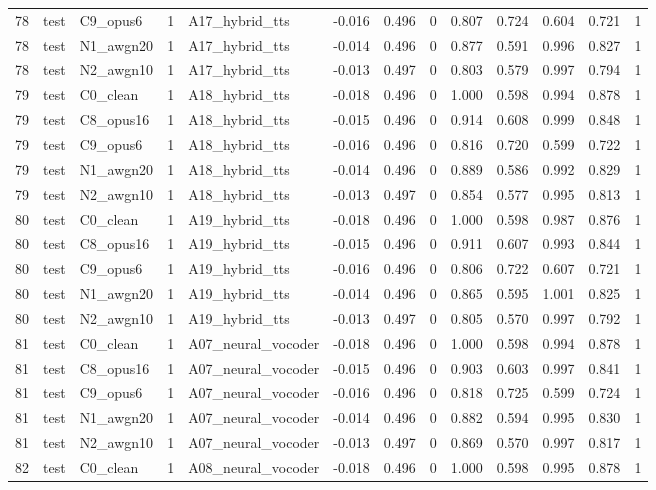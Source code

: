 \begin{tabular}{rllrlrrrrrrrr}
78 & test & C9_opus6 & 1 & A17_hybrid_tts & -0.016 & 0.496 & 0 & 0.807 & 0.724 & 0.604 & 0.721 & 1 \\
78 & test & N1_awgn20 & 1 & A17_hybrid_tts & -0.014 & 0.496 & 0 & 0.877 & 0.591 & 0.996 & 0.827 & 1 \\
78 & test & N2_awgn10 & 1 & A17_hybrid_tts & -0.013 & 0.497 & 0 & 0.803 & 0.579 & 0.997 & 0.794 & 1 \\
79 & test & C0_clean & 1 & A18_hybrid_tts & -0.018 & 0.496 & 0 & 1.000 & 0.598 & 0.994 & 0.878 & 1 \\
79 & test & C8_opus16 & 1 & A18_hybrid_tts & -0.015 & 0.496 & 0 & 0.914 & 0.608 & 0.999 & 0.848 & 1 \\
79 & test & C9_opus6 & 1 & A18_hybrid_tts & -0.016 & 0.496 & 0 & 0.816 & 0.720 & 0.599 & 0.722 & 1 \\
79 & test & N1_awgn20 & 1 & A18_hybrid_tts & -0.014 & 0.496 & 0 & 0.889 & 0.586 & 0.992 & 0.829 & 1 \\
79 & test & N2_awgn10 & 1 & A18_hybrid_tts & -0.013 & 0.497 & 0 & 0.854 & 0.577 & 0.995 & 0.813 & 1 \\
80 & test & C0_clean & 1 & A19_hybrid_tts & -0.018 & 0.496 & 0 & 1.000 & 0.598 & 0.987 & 0.876 & 1 \\
80 & test & C8_opus16 & 1 & A19_hybrid_tts & -0.015 & 0.496 & 0 & 0.911 & 0.607 & 0.993 & 0.844 & 1 \\
80 & test & C9_opus6 & 1 & A19_hybrid_tts & -0.016 & 0.496 & 0 & 0.806 & 0.722 & 0.607 & 0.721 & 1 \\
80 & test & N1_awgn20 & 1 & A19_hybrid_tts & -0.014 & 0.496 & 0 & 0.865 & 0.595 & 1.001 & 0.825 & 1 \\
80 & test & N2_awgn10 & 1 & A19_hybrid_tts & -0.013 & 0.497 & 0 & 0.805 & 0.570 & 0.997 & 0.792 & 1 \\
81 & test & C0_clean & 1 & A07_neural_vocoder & -0.018 & 0.496 & 0 & 1.000 & 0.598 & 0.994 & 0.878 & 1 \\
81 & test & C8_opus16 & 1 & A07_neural_vocoder & -0.015 & 0.496 & 0 & 0.903 & 0.603 & 0.997 & 0.841 & 1 \\
81 & test & C9_opus6 & 1 & A07_neural_vocoder & -0.016 & 0.496 & 0 & 0.818 & 0.725 & 0.599 & 0.724 & 1 \\
81 & test & N1_awgn20 & 1 & A07_neural_vocoder & -0.014 & 0.496 & 0 & 0.882 & 0.594 & 0.995 & 0.830 & 1 \\
81 & test & N2_awgn10 & 1 & A07_neural_vocoder & -0.013 & 0.497 & 0 & 0.869 & 0.570 & 0.997 & 0.817 & 1 \\
82 & test & C0_clean & 1 & A08_neural_vocoder & -0.018 & 0.496 & 0 & 1.000 & 0.598 & 0.995 & 0.878 & 1 \\

\end{tabular}
